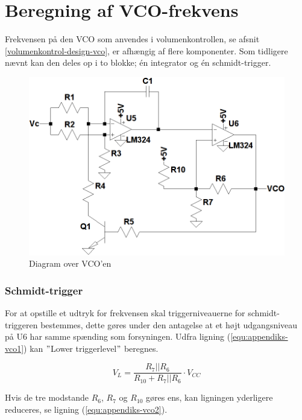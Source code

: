 \chapter{Beregning af VCO-frekvens}
\label{vco-frekvens}

Frekvensen på den VCO som anvendes i volumenkontrollen, se afsnit \ref{volumenkontrol-design-vco}, er afhængig af flere komponenter. Som tidligere nævnt kan den deles op i to blokke; én integrator og én schmidt-trigger. 

\begin{figure}[h]
\centering
\includegraphics[width=\textwidth]{teknisk/volumenkontrol/vco.png}
\caption{Diagram over VCO'en}
\label{fig:appendiks-vco}
\end{figure}

\subsection*{Schmidt-trigger}

For at opstille et udtryk for frekvensen skal triggerniveauerne for schmidt-triggeren bestemmes, dette gøres under den antagelse at et højt udgangsniveau på U6 har samme spænding som forsyningen. Udfra ligning (\ref{equ:appendiks-vco1}) kan $"$Lower triggerlevel$"$ beregnes.

\begin{equation}
\label{equ:appendiks-vco1}
V_L = \frac{R_7||R_6}{R_{10} + R_7||R_6} \cdot V_{CC}
\end{equation}

Hvis de tre modstande $R_6$, $R_7$ og $R_{10}$ gøres ens, kan ligningen yderligere reduceres, se ligning (\ref{equ:appendiks-vco2}).

